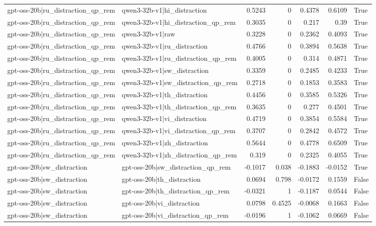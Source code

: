 \begin{table}
\begin{tabular}{l l r r r r l}
gpt-oss-20b|ru_distraction_qp_rem & qwen3-32b-v1|hi_distraction & 0.5243 & 0 & 0.4378 & 0.6109 & True \\
gpt-oss-20b|ru_distraction_qp_rem & qwen3-32b-v1|hi_distraction_qp_rem & 0.3035 & 0 & 0.217 & 0.39 & True \\
gpt-oss-20b|ru_distraction_qp_rem & qwen3-32b-v1|raw & 0.3228 & 0 & 0.2362 & 0.4093 & True \\
gpt-oss-20b|ru_distraction_qp_rem & qwen3-32b-v1|ru_distraction & 0.4766 & 0 & 0.3894 & 0.5638 & True \\
gpt-oss-20b|ru_distraction_qp_rem & qwen3-32b-v1|ru_distraction_qp_rem & 0.4005 & 0 & 0.314 & 0.4871 & True \\
gpt-oss-20b|ru_distraction_qp_rem & qwen3-32b-v1|sw_distraction & 0.3359 & 0 & 0.2485 & 0.4233 & True \\
gpt-oss-20b|ru_distraction_qp_rem & qwen3-32b-v1|sw_distraction_qp_rem & 0.2718 & 0 & 0.1853 & 0.3583 & True \\
gpt-oss-20b|ru_distraction_qp_rem & qwen3-32b-v1|th_distraction & 0.4456 & 0 & 0.3585 & 0.5326 & True \\
gpt-oss-20b|ru_distraction_qp_rem & qwen3-32b-v1|th_distraction_qp_rem & 0.3635 & 0 & 0.277 & 0.4501 & True \\
gpt-oss-20b|ru_distraction_qp_rem & qwen3-32b-v1|vi_distraction & 0.4719 & 0 & 0.3854 & 0.5584 & True \\
gpt-oss-20b|ru_distraction_qp_rem & qwen3-32b-v1|vi_distraction_qp_rem & 0.3707 & 0 & 0.2842 & 0.4572 & True \\
gpt-oss-20b|ru_distraction_qp_rem & qwen3-32b-v1|zh_distraction & 0.5644 & 0 & 0.4778 & 0.6509 & True \\
gpt-oss-20b|ru_distraction_qp_rem & qwen3-32b-v1|zh_distraction_qp_rem & 0.319 & 0 & 0.2325 & 0.4055 & True \\
gpt-oss-20b|sw_distraction & gpt-oss-20b|sw_distraction_qp_rem & -0.1017 & 0.038 & -0.1883 & -0.0152 & True \\
gpt-oss-20b|sw_distraction & gpt-oss-20b|th_distraction & 0.0694 & 0.798 & -0.0172 & 0.1559 & False \\
gpt-oss-20b|sw_distraction & gpt-oss-20b|th_distraction_qp_rem & -0.0321 & 1 & -0.1187 & 0.0544 & False \\
gpt-oss-20b|sw_distraction & gpt-oss-20b|vi_distraction & 0.0798 & 0.4525 & -0.0068 & 0.1663 & False \\
gpt-oss-20b|sw_distraction & gpt-oss-20b|vi_distraction_qp_rem & -0.0196 & 1 & -0.1062 & 0.0669 & False \\

\end{tabular}
\end{table}

